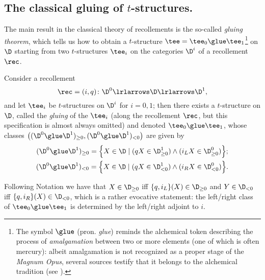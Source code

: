 
\subsection{The classical gluing of $t$-structures.}\label{classrec}
The main result in the classical theory of recollements is the so-called \emph{gluing theorem}, which tells us how to obtain a $t$-structure $\tee = \tee_0 \glue \tee_1$\footnote{The symbol $\glue$ (pron. \emph{glue}) reminds the alchemical token describing the process of \emph{amalgamation} between two or more elements (one of which is often mercury): albeit amalgamation is not recognized as a proper stage of the \emph{Magnum Opus}, several sources testify that it belongs to the alchemical tradition (see \cite[pp. \textbf{409-498}]{roth1976deutsches}).} on $\D$ starting from two $t$-structures $\tee_i$ on the categories $\D^i$ of a recollement $\rec$.
\begin{theorem}\label{gluing}
Consider a recollement $$\rec = (i,q)\colon \D^0 \lrlarrows  \D \lrlarrows  \D^1,$$ and let $\tee_i$ be $t$-structures on $\D^i$ for $i=0,1$; then there exists a $t$-structure on $\D$, called the \emph{gluing} of the $\tee_i$ (along the recollement $\rec$, but this specification is almost always omitted) and denoted $\tee_0\glue \tee_1$, whose classes $\big( (\D^0\glue \D^1)_{\ge 0}, (\D^0\glue \D^1)_{<0}\big)$ are given by
\begin{gather}
(\D^0\glue \D^1)_{\ge 0} = \Big\{ X\in\D\mid (q X\in \D_{\ge 0}^1)\land (i_L X\in \D_{\ge 0}^0) \Big\};\notag \\
(\D^0\glue \D^1)_{<0} = \Big\{ X\in\D\mid ( q X\in \D_{< 0}^1)\land (i_R X\in \D_{< 0}^0) \Big\}.\label{glued}
\end{gather}
\end{theorem}
\begin{remark}
Following Notation  we have that $X\in \D_{\ge 0}$ iff $\{q, i_L\}(X)\in \D_{\ge 0}$  and $Y\in \D_{<0}$ iff $\{q, i_R\}(X)\in \D_{<0}$, which is a rather evocative statement: the left/right class of $\tee_0\glue \tee_1$ is determined by the left/right adjoint to $i$.%
\end{remark}

